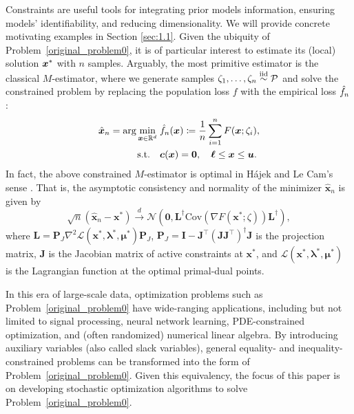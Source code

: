 \documentclass[aos]{imsart}
\numberwithin{equation}{section}
\theoremstyle{plain}
\begin{document}
Constraints are useful tools for integrating prior models information, ensuring models' identifiability, and reducing dimensionality. 
We will provide concrete motivating examples in Section \ref{sec:1.1}. 
Given the ubiquity of Problem~\eqref{original_problem0}, it is of particular interest to estimate its (local) solution $\tx$ with $n$ samples. Arguably, the most primitive estimator is the classical $M$-estimator, where we generate samples $\zeta_1,\ldots,\zeta_n\stackrel{\text{iid}}{\sim} \P$ and solve the constrained problem by replacing the population loss $f$ with the empirical loss $\hf_n$:
\begin{equation*}
	\begin{split}
		\hx_n  = \arg\min_{\bx\in\mR^d}\; & \hf_n(\bx)\coloneqq \frac{1}{n}\sum_{i=1}^{n} F(\bx;\zeta_i),\\
		\text{s.t.} \hspace{1em} & \bm{c}(\bm{x}) = \bm{0},\quad \bm{\ell} \leq \bm{x} \leq \bm{u}.
	\end{split}
\end{equation*}
In fact, the above constrained $M$-estimator is optimal in  H\'ajek and Le Cam's sense \cite{le2000asymptotics, van2000asymptotic}.
That is, the asymptotic consistency and normality of the minimizer $\hat{\bm{x}}_{n}$ is given by 
\begin{equation}
\label{M-estimator}
    \sqrt{n} \left( \hat{\bm{x}}_{n} - \bm{x}^{*} \right) \stackrel{d}{\longrightarrow} \mathcal{N} \left( \bm{0}, \bm{L}^{\dag} \text{Cov}\left( \nabla F(\bm{x}^{*};\zeta) \right) \bm{L}^{\dag}\right),
\end{equation}
where $\bm{L} = \bm{P}_{J} \nabla^2 \mathcal{L}(\bm{x}^{*},\bm{\lambda}^{*},\bm{\mu}^{*})\bm{P}_{J}$, $\bm{P}_{J} = \bm{I} - \bm{J}^{\top}\left( \bm{J}\bm{J}^{\top}\right)^{\dag}\bm{J}$ is the projection matrix, $\bm{J}$ is the Jacobian matrix of active constraints at $\bm{x}^{*}$, and $\mathcal{L}(\bm{x}^{*},\bm{\lambda}^{*},\bm{\mu}^{*})$ is the Lagrangian function at the optimal primal-dual points. 



In this era of large-scale data, optimization problems such as Problem~\eqref{original_problem0} have wide-ranging applications, including but not limited to signal processing, neural network learning, PDE-constrained optimization, and (often randomized) numerical linear algebra.
By introducing auxiliary variables (also called slack variables), general equality- and inequality-constrained problems can be transformed into the form of Problem~\eqref{original_problem0}.
Given this equivalency, the focus of this paper is on developing stochastic optimization algorithms to solve Problem~\eqref{original_problem0}.
\end{document}
